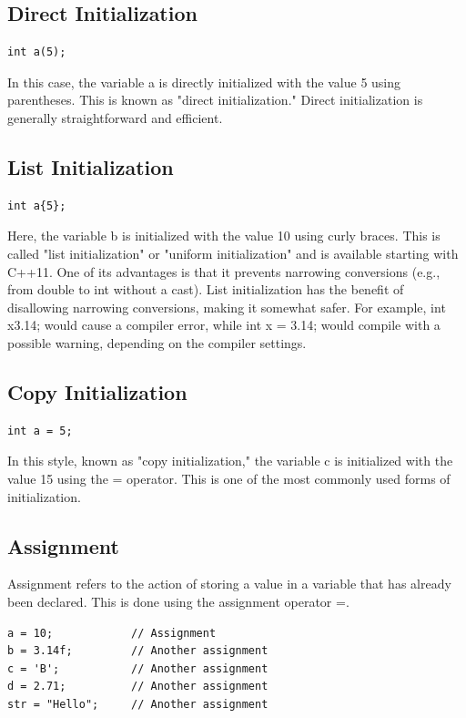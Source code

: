 \documentclass{report}
\begin{document}
    \bigbreak \noindent 
    \subsection{Direct Initialization}
    \bigbreak \noindent 
    \sepline
    \begin{verbatim}
int a(5);
    \end{verbatim}
    \sepline
    \bigbreak \noindent 
    In this case, the variable a is directly initialized with the value 5 using parentheses. This is known as "direct initialization." Direct initialization is generally straightforward and efficient.

    \bigbreak \noindent 
    \subsection{List Initialization}
    \bigbreak \noindent 
    \sepline
    \begin{verbatim}
int a{5};
    \end{verbatim}
    \sepline
    \bigbreak \noindent 
    Here, the variable b is initialized with the value 10 using curly braces. This is called "list initialization" or "uniform initialization" and is available starting with C++11. One of its advantages is that it prevents narrowing conversions (e.g., from double to int without a cast).
    \bigbreak \noindent 
    List initialization has the benefit of disallowing narrowing conversions, making it somewhat safer. For example, int x{3.14}; would cause a compiler error, while int x = 3.14; would compile with a possible warning, depending on the compiler settings.

    \bigbreak \noindent 
    \subsection{Copy Initialization}
    \bigbreak \noindent 
    \sepline
    \begin{verbatim}
int a = 5;
    \end{verbatim}
    \sepline
    \bigbreak \noindent 
    In this style, known as "copy initialization," the variable c is initialized with the value 15 using the = operator. This is one of the most commonly used forms of initialization.



    \bigbreak \noindent 
    \subsection{Assignment}
    \bigbreak \noindent 
    Assignment refers to the action of storing a value in a variable that has already been declared. This is done using the assignment operator =.
    \bigbreak \noindent 
    \sepline
    \begin{verbatim}
a = 10;            // Assignment
b = 3.14f;         // Another assignment
c = 'B';           // Another assignment
d = 2.71;          // Another assignment
str = "Hello";     // Another assignment
    \end{verbatim}
    \sepline
    \bigbreak \noindent 
\end{document}

